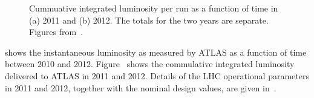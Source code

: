 \begin{figure}[h]
\centering
\caption{Cummuative integrated luminosity per run as a function of time in (a)
2011 and (b) 2012. The totals for the two years are separate. 
Figures from~\cite{atlaslumipublic}.}
\label{fig:lhc-int-lumi}
\end{figure}

 shows the
instantaneous luminosity as measured by ATLAS as a function of time between 2010 and
2012. Figure~ shows the commulative integrated luminosity
delivered to ATLAS in 2011 and 2012.
Details of the LHC operational parameters in 2011 and 2012, together with the
nominal design values, are given in~.




